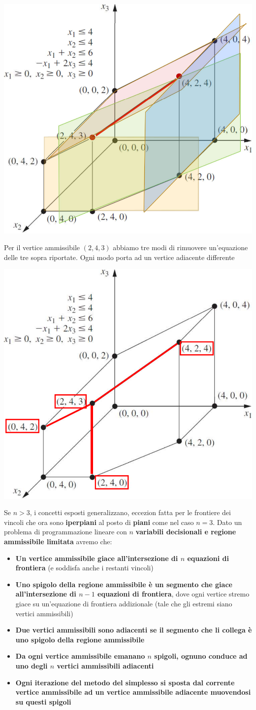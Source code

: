 \documentclass[12pt]{article}
\begin{document}
\begin{center}
    \includegraphics[width = 0.60\linewidth]{Images/42.png}
\end{center}
Per il vertice ammissibile $(2, 4, 3)$ abbiamo tre modi di rimuovere un'equazione delle tre sopra riportate.
Ogni modo porta ad un vertice adiacente differente
\begin{center}
    \includegraphics[width = 0.60\linewidth]{Images/43.png}
\end{center}
Se $n>3$, i concetti esposti generalizzano, eccezion fatta per le frontiere dei vincoli che ora sono \textbf{iperpiani} al posto di \textbf{piani} come nel caso $n = 3$.
Dato un problema di programmazione lineare con $n$ \textbf{variabili decisionali e regione ammissibile limitata} avremo che:
\begin{itemize}
    \item \textbf{Un vertice ammissibile giace all'intersezione di $n$ equazioni di frontiera} (e soddisfa anche i restanti vincoli)
    \item \textbf{Uno spigolo della regione ammissibile è un segmento che giace all'intersezione di $n-1$ equazioni di frontiera}, dove ogni vertice stremo giace su un'equazione di frontiera addizionale (tale che gli estremi siano vertici ammissibili)
    \item \textbf{Due vertici ammissibili sono adiacenti se il segmento che li collega è uno spigolo della regione ammissibile}
    \item \textbf{Da ogni vertice ammissibile emanano $n$ spigoli, ognuno conduce ad uno degli $n$ vertici ammissibili adiacenti}
    \item \textbf{Ogni iterazione del metodo del simplesso si sposta dal corrente vertice ammissibile ad un vertice ammissibile adiacente muovendosi su questi spigoli}
\end{itemize}
\end{document}
